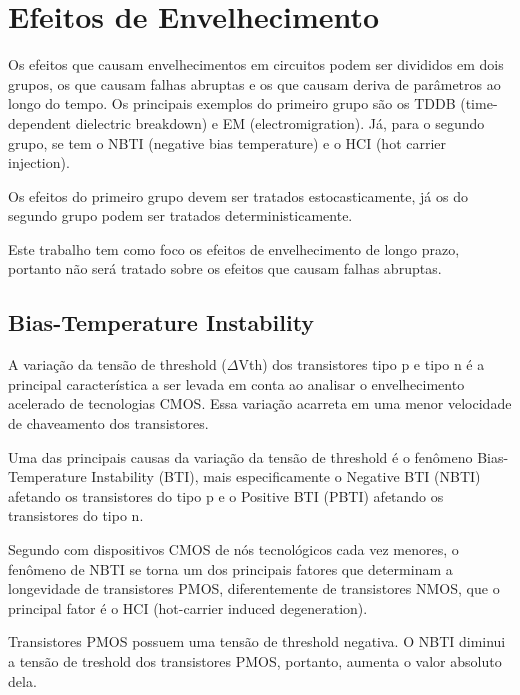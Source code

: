 \section{Efeitos de Envelhecimento}
Os efeitos que causam envelhecimentos em circuitos podem ser divididos em dois grupos, os que causam falhas abruptas e os que causam deriva de parâmetros ao longo do tempo. Os principais exemplos do primeiro grupo são os TDDB (time-dependent dielectric breakdown) e EM (electromigration). Já, para o segundo grupo, se tem o NBTI (negative bias temperature) e o HCI (hot carrier injection).

Os efeitos do primeiro grupo devem ser tratados estocasticamente, já os do segundo grupo podem ser tratados deterministicamente.

Este trabalho tem como foco os efeitos de envelhecimento de longo prazo, portanto não será tratado sobre os efeitos que causam falhas abruptas.

\subsection{Bias-Temperature Instability}
A variação da tensão de threshold ($\Delta$Vth) dos transistores tipo p e tipo n é a principal característica a ser levada em conta ao analisar o envelhecimento acelerado de tecnologias CMOS. Essa variação acarreta em uma menor velocidade de chaveamento dos transistores.

Uma das principais causas da variação da tensão de threshold é o fenômeno Bias-Temperature Instability (BTI), mais especificamente o Negative BTI (NBTI) afetando os transistores do tipo p e o Positive BTI (PBTI) afetando os transistores do tipo n.

Segundo \cite{Bhardwaj} com dispositivos CMOS de nós tecnológicos cada vez menores, o fenômeno de NBTI se torna um dos principais fatores que determinam a longevidade de transistores PMOS, diferentemente de transistores NMOS, que o principal fator é o HCI (hot-carrier induced degeneration).

Transistores PMOS possuem uma tensão de threshold negativa. O NBTI diminui a tensão de treshold dos transistores PMOS, portanto, aumenta o valor absoluto dela.



